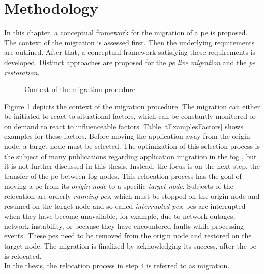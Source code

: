 \section{Methodology}
\label{lMethodology}

In this chapter, a conceptual framework for the migration of a \gls{pe} is proposed. The context of the migration is assessed first. Then the underlying requirements are outlined. After that, a conceptual framework satisfying these requirements is developed. Distinct approaches are proposed for the \textit{\acrshort{pe} live migration} and the \textit{\acrshort{pe} restoration}.\par

\begin{figure}[!ht]
\graphicspath{{./figures/code/}}

\caption{Context of the migration procedure}
\label{fMigrationContext}
\end{figure}

Figure \ref{fMigrationContext} depicts the context of the migration procedure. The migration can either be initiated to react to situational factors, which can be constantly monitored or on demand to react to influenceable factors. Table \ref{tExamplesFactors} shows examples for these factors. Before moving the application away from the origin node, a target node must be selected. The optimization of this selection process is the subject of many publications regarding application migration in the fog \cite{Goncalves.2018, Yao.2015, Puliafito.2018, Saurez.2016}, but it is not further discussed in this thesis. Instead, the focus is on the next step, the transfer of the \gls{pe} between fog nodes. This relocation process has the goal of moving a \gls{pe} from its \textit{origin node} to a specific \textit{target node}. Subjects of the relocation are orderly \textit{running \gls{pe}s}, which must be stopped on the origin node and resumed on the target node and so-called \textit{interrupted \gls{pe}s}. \gls{pe}s are interrupted when they have become unavailable, for example, due to network outages, network instability, or because they have encountered faults while processing events. These \gls{pe}s need to be removed from the origin node and restored on the target node. The migration is finalized by acknowledging its success, after the \gls{pe} is relocated.\\
In the thesis, the relocation process in step 4 is referred to as migration.\par


